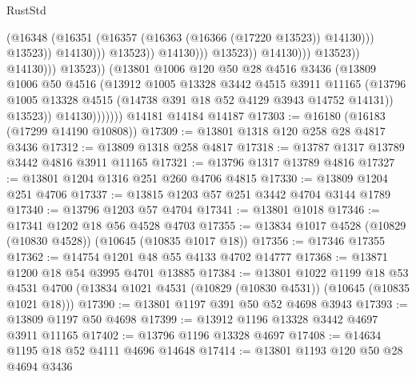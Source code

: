 \begin{lexlean}{RustStd}
\begin{coremodule}
                                                          (@16348
                                                            (@16351
                                                              (@16357
                                                                (@16363
                                                                  (@16366 (@17220 @13523))
                                                                  @14130)))
                                                            @13523))
                                                        @14130)))
                                                  @13523))
                                              @14130)))
                                        @13523))
                                    @14130)))
                              @13523))
                          @14130)))
                    @13523))
                (@13801
                  @1006
                  @120
                  @50
                  @28
                  @4516
                  @3436
                  (@13809
                    @1006
                    @50
                    @4516
                    (@13912
                      @1005
                      @13328
                      @3442
                      @4515
                      @3911
                      @11165
                      (@13796 @1005 @13328 @4515 (@14738 @391 @18 @52 @4129 @3943 @14752 @14131))
                      @13523))
                  @14130)))))))
    @14181
    @14184
    @14187
@17303 := @16180 (@16183 (@17299 @14190 @10808))
@17309 := @13801 @1318 @120 @258 @28 @4817 @3436
@17312 := @13809 @1318 @258 @4817
@17318 := @13787 @1317 @13789 @3442 @4816 @3911 @11165
@17321 := @13796 @1317 @13789 @4816
@17327 := @13801 @1204 @1316 @251 @260 @4706 @4815
@17330 := @13809 @1204 @251 @4706
@17337 := @13815 @1203 @57 @251 @3442 @4704 @3144 @1789
@17340 := @13796 @1203 @57 @4704
@17341 := @13801 @1018
@17346 := @17341 @1202 @18 @56 @4528 @4703
@17355 := @13834 @1017 @4528 (@10829 (@10830 @4528)) (@10645 (@10835 @1017 @18))
@17356 := @17346 @17355
@17362 := @14754 @1201 @48 @55 @4133 @4702 @14777
@17368 := @13871 @1200 @18 @54 @3995 @4701 @13885
@17384 := @13801
    @1022
    @1199
    @18
    @53
    @4531
    @4700
    (@13834 @1021 @4531 (@10829 (@10830 @4531)) (@10645 (@10835 @1021 @18)))
@17390 := @13801 @1197 @391 @50 @52 @4698 @3943
@17393 := @13809 @1197 @50 @4698
@17399 := @13912 @1196 @13328 @3442 @4697 @3911 @11165
@17402 := @13796 @1196 @13328 @4697
@17408 := @14634 @1195 @18 @52 @4111 @4696 @14648
@17414 := @13801 @1193 @120 @50 @28 @4694 @3436

\end{coremodule}
\end{lexlean}
